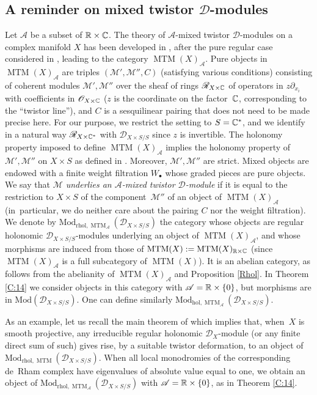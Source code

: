 \documentclass[english]{smfart}
\numberwithin{subsection}{section}
\def\sha{\mathcal{A}}\let\cA\sha
\def\shd{\mathcal{D}}\let\cD\shd
\def\shm{\mathcal{M}}
\def\sho{\mathcal{O}}\let\cO\sho
\def\shr{\mathcal{R}}
\newcommand{\hol}{\mathrm{hol}}
\newcommand{\rhol}{\mathrm{rhol}}
\newcommand{\Mod}{\mathrm{Mod}}
\newcommand{\XS}{X\times S}
\newcommand{\DXS}{\shd_{\XS/S}}
\DeclareMathOperator{\MTM}{MTM}
\newcommand{\sbullet}{{\scriptscriptstyle\bullet}}
\numberwithin{equation}{section}
\theoremstyle{plain}
\theoremstyle{definition}
\begin{document}
\subsection{A reminder on mixed twistor $\shd$-modules}\label{subsec:MTMreminder}
Let $\sha$ be a subset of $\mathbb{R}\times\mathbb{C}$. The theory of $\sha$-mixed twistor $\shd$-modules on a complex manifold $X$ has been developed in \cite{Mochizuki11}, after the pure regular case considered in \cite{Bibi01c,Mochizuki07}, leading to the category $\MTM(X)_\sha$. Pure objects in $\MTM(X)_\sha$ are triples $(\shm',\shm'',C)$ (satisfying various conditions) consisting of coherent modules $\shm',\shm''$ over the sheaf of rings $\shr_{X\times\CC}$ of operators in $z\partial_{x_i}$ with coefficients in $\sho_{X\times\CC}$ ($z$ is the coordinate on the factor~$\mathbb{C}$, corresponding to the ``twistor line''), and $C$ is a sesquilinear pairing that does not need to be made precise here. For our purpose, we restrict the setting to $S=\mathbb{C}^*$, and we identify in a natural way $\shr_{X\times\CC^*}$ with $\DXS$ since $z$ is invertible. The holonomy property imposed to define $\MTM(X)_\sha$ implies the holonomy property of $\shm',\shm''$ on $\XS$ as defined in \hbox{\cite[\S3.4]{MF-S12}}. Moreover, $\shm',\shm''$ are strict. Mixed objects are endowed with a finite weight filtration $W_\sbullet$ whose graded pieces are pure objects. We say that \emph{$\shm$ underlies an $\sha$-mixed twistor $\shd$-module} if it is equal to the restriction to $\XS$ of the component~$\shm''$ of an object of $\MTM(X)_\sha$ (in~particular, we do neither care about the pairing $C$ nor the weight filtration). We denote by $\Mod_{\rhol,\MTM_\sha}(\DXS)$ the category whose objects are regular holonomic $\DXS$-modules underlying an object of $\MTM(X)_\sha$, and whose morphisms are induced from those of $\MTM(X):=\MTM(X)_{\RR\times\CC}$ (since $\MTM(X)_\sha$ is a full subcategory of $\MTM(X)$). It is an abelian category, as follows from the abelianity of $\MTM(X)_\sha$ and Proposition \ref{Rhol}. In Theorem \ref{C:14} we consider objects in this category with $\sha=\RR\times\{0\}$, but morphisms are in $\Mod(\DXS)$. One can define similarly $\Mod_{\hol,\MTM_\sha}(\DXS)$.

As an example, let us recall the main theorem of \cite{Mochizuki07} which implies that, when~$X$ is smooth projective, any irreducible regular holonomic $\shd_X$-module (or any finite direct sum of such) gives rise, by a suitable twistor deformation, to an object of $\Mod_{\rhol,\MTM}(\DXS)$. When all local monodromies of the corresponding de~Rham complex have eigenvalues of absolute value equal to one, we obtain an object of $\Mod_{\rhol,\MTM_\sha}(\DXS)$ with $\sha=\RR\times\{0\}$, as in Theorem \ref{C:14}.
\end{document}
